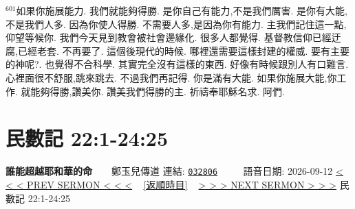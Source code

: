 \documentclass{book}
\begin{document}
$^{601}$如果你施展能力.
我們就能夠得勝.
是你自己有能力,不是我們厲害.
是你有大能,不是我們人多.
因為你使人得勝.
不需要人多,是因為你有能力.
主我們記住這一點,仰望等候你.
我們今天見到教會被社會邊緣化.
很多人都覺得.
基督教信仰已經迂腐,已經老套.
不再要了.
這個後現代的時候.
哪裡還需要這樣封建的權威.
要有主要的神呢?.
也覺得不合科學.
其實完全沒有這樣的東西.
好像有時候跟別人有口難言.
心裡面很不舒服,跳來跳去.
不過我們再記得.
你是滿有大能.
如果你施展大能,你工作.
就能夠得勝,讚美你.
讚美我們得勝的主.
祈禱奉耶穌名求.
阿們.
\newpage



\section{民數記 22:1-24:25}
\label{sec:032806}
\textbf{誰能超越耶和華的命}~~~~鄭玉兒傳道
\newline
\newline
連結: \href{http://www.church.com.hk/acms/content.asp?site=cdc\&op=show\&type=product\&code=032806\&layout=sermon}{\texttt{032806}} ~~~~ 語音日期: 2026-09-12
\newline
\newline
\hyperref[sec:032805]{\small{< < < PREV SERMON < < <}}
~
\hyperref[sec:index_chronic]{\small{[返順時目]}}
~
\hyperref[sec:032807]{\small{> > > NEXT SERMON > > >}}
\newline
\newline
民數記 22:1-24:25
\newline
\end{document}
